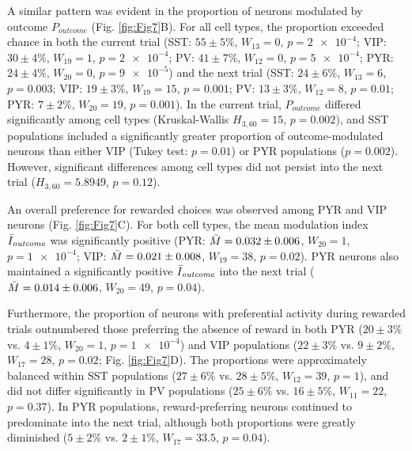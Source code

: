 A similar pattern was evident in the proportion of neurons modulated by outcome $P_{\mathit{outcome}}$ (Fig. \ref{fig:Fig7}B). For all cell types, the proportion exceeded chance in both the current trial (SST: $55\pm5\%$, $W_{13}=0$, $p=\num{2e-4}$; VIP: $30\pm4\%$, $W_{19}=1$, $p=\num{2e-4}$; PV: $41\pm7\%$, $W_{12}=0$, $p=\num{5e-4}$; PYR: $24\pm4\%$, $W_{20}=0$, $p=\num{9e-5}$) and the next trial (SST: $24\pm6\%$, $W_{13}=6$, $p=\num{0.003}$; VIP: $19\pm3\%$, $W_{19}=15$, $p=\num{0.001}$; PV: $13\pm3\%$, $W_{12}=8$, $p=\num{0.01}$; PYR: $7\pm2\%$, $W_{20}=19$, $p=\num{0.001}$). In the current trial, $P_{\mathit{outcome}}$ differed significantly among cell types (Kruskal-Wallis $H_{3,60}=15$, $p=0.002$), and SST populations included a significantly greater proportion of outcome-modulated neurons than either VIP (Tukey test: $p=0.01$) or PYR populations ($p=0.002$). However, significant differences among cell types did not persist into the next trial ($H_{3,60}=5.8949$, $p=0.12$).


An overall preference for rewarded choices was observed among PYR and VIP neurons (Fig. \ref{fig:Fig7}C). For both cell types, the mean modulation index $\Bar{I}_{\mathit{outcome}}$ was significantly positive (PYR: $\Bar{M}=0.032\pm0.006$, $W_{20}=1$, $p=\num{1e-4}$; VIP: $\Bar{M}=0.021\pm0.008$, $W_{19}=38$, $p=\num{0.02}$). PYR neurons also maintained a significantly positive $\Bar{I}_{\mathit{outcome}}$ into the next trial ($\Bar{M}=0.014\pm0.006$, $W_{20}=49$, $p=\num{0.04}$).

Furthermore, the proportion of neurons with preferential activity during rewarded trials outnumbered those preferring the absence of reward in both PYR ($20\pm3\%$ vs. $4\pm1\%$, $W_{20}=1$, $p=\num{1e-4}$) and VIP populations ($22\pm3\%$ vs. $9\pm2\%$, $W_{17}=28$, $p=\num{0.02}$; Fig. \ref{fig:Fig7}D). The proportions were approximately balanced within SST populations ($27\pm6\%$ vs. $28\pm5\%$, $W_{12}=39$, $p=\num{1}$), and did not differ significantly in PV populations ($25\pm6\%$ vs. $16\pm5\%$, $W_{11}=22$, $p=\num{0.37}$). In PYR populations, reward-preferring neurons continued to predominate into the next trial, although both proportions were greatly diminished ($5\pm2\%$ vs. $2\pm1\%$, $W_{17}=33.5$, $p=\num{0.04}$).

